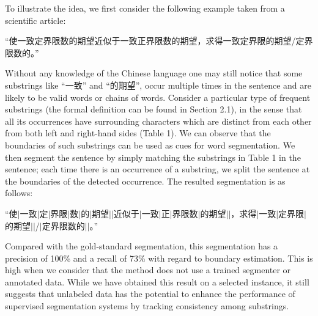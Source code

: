 \documentclass[english]{jnlp_1.4}
\begin{document}
To illustrate the idea, we first consider the following example taken from a scientific article:


``使一致定界限数的期望近似于一致正界限数的期望，求得一致定界限的期望/定界限数的。''

\begin{table}[b]

\end{table}


Without any knowledge of the Chinese language one may still notice that some substrings like ``一致'' and ``的期望'', occur multiple times in the sentence and are likely to be valid words or chains of words. Consider a particular type of frequent substrings (the formal definition can be found in Section 2.1), in the sense that all its occurrences have surrounding characters which are distinct from each other from both left and right-hand sides (Table 1). We can observe that the boundaries of such substrings can be used as cues for word segmentation. We then segment the sentence by simply matching the substrings in Table 1 in the sentence; each time there is an occurrence of a substring, we split the sentence at the boundaries of the detected occurrence. The resulted segmentation is as follows:


``使$\vert$一致$\vert$定$\vert$界限$\vert$数$\vert$的$\vert$期望$\vert$$\vert$近似于$\vert$一致$\vert$正$\vert$界限数$\vert$的期望$\vert$$\vert$，求得$\vert$一致$\vert$定界限$\vert$的期望$\vert$$\vert$/$\vert$定界限数的$\vert$$\vert$。''


Compared with the gold-standard segmentation, this segmentation has a precision of 100\% and a recall of 73\% with regard to boundary estimation. This is high when we consider that the method does not use a trained segmenter or annotated data. While we have obtained this result on a selected instance, it still suggests that unlabeled data has the potential to enhance the performance of supervised segmentation systems by tracking consistency among substrings.
\end{document}
